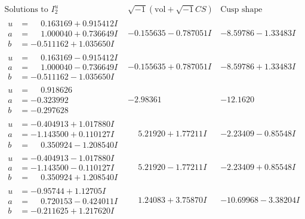 \documentclass[1p]{elsarticle_modified}
\theoremstyle{definition}
\newcommand{\I}{\sqrt{-1}}
\begin{document}
$$\begin{array}{c|c|c}  
\text{Solutions to }I^u_{2}& \I (\text{vol} + \sqrt{-1}CS) & \text{Cusp shape}\\
 \hline 
\begin{aligned}
u &= \phantom{-}0.163169 + 0.915412 I \\
a &= \phantom{-}1.000040 + 0.736649 I \\
b &= -0.511162 + 1.035650 I\end{aligned}
 & -0.155635 - 0.787051 I & -8.59786 - 1.33483 I \\ \hline\begin{aligned}
u &= \phantom{-}0.163169 - 0.915412 I \\
a &= \phantom{-}1.000040 - 0.736649 I \\
b &= -0.511162 - 1.035650 I\end{aligned}
 & -0.155635 + 0.787051 I & -8.59786 + 1.33483 I \\ \hline\begin{aligned}
u &= \phantom{-}0.918626\phantom{ +0.000000I} \\
a &= -0.323992\phantom{ +0.000000I} \\
b &= -0.297628\phantom{ +0.000000I}\end{aligned}
 & -2.98361\phantom{ +0.000000I} & -12.1620\phantom{ +0.000000I} \\ \hline\begin{aligned}
u &= -0.404913 + 1.017880 I \\
a &= -1.143500 + 0.110127 I \\
b &= \phantom{-}0.350924 - 1.208540 I\end{aligned}
 & \phantom{-}5.21920 + 1.77211 I & -2.23409 - 0.85548 I \\ \hline\begin{aligned}
u &= -0.404913 - 1.017880 I \\
a &= -1.143500 - 0.110127 I \\
b &= \phantom{-}0.350924 + 1.208540 I\end{aligned}
 & \phantom{-}5.21920 - 1.77211 I & -2.23409 + 0.85548 I \\ \hline\begin{aligned}
u &= -0.95744 + 1.12705 I \\
a &= \phantom{-}0.720153 - 0.424011 I \\
b &= -0.211625 + 1.217620 I\end{aligned}
 & \phantom{-}1.24083 + 3.75870 I & -10.69968 - 3.38204 I \\ \hline\begin{aligned}

\end{aligned}
\end{array}$$
\end{document}
